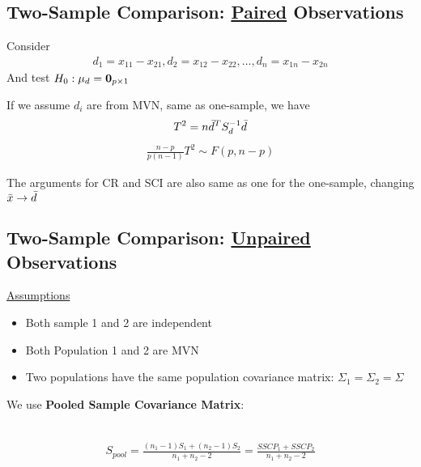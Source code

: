 \documentclass[12pt]{extarticle}
\newcommand{\<}{\langle}
\renewcommand{\>}{\rangle}
\theoremstyle{definition}
\begin{document}
\newpage
\subsection{Two-Sample Comparison: \underline{Paired} Observations}
Consider 
\begin{eqnarray*}
d_1 = x_{11}-x_{21}, d_2 = x_{12}-x_{22}, ..., d_n = x_{1n}-x_{2n} 
\end{eqnarray*}
And test $H_0: \mu_d = {\bf 0}_{p \times 1}$ \\

\begin{tcolorbox}[enhanced, drop fuzzy shadow, title=Statistics for paired observations]
If we assume $d_i$ are from MVN, same as one-sample, we have
\begin{eqnarray*}
T^2 = n\Bar{d}^T S_d^{-1} \Bar{d} \end{eqnarray*}
\begin{eqnarray*}
\frac{n-p}{p(n-1)}T^2 \sim F(p, n-p)
\end{eqnarray*}
\end{tcolorbox}

The arguments for CR and SCI are also same as one for the one-sample, changing $\Bar{x} \rightarrow \Bar{d}$ \\

\newpage
\subsection{Two-Sample Comparison: \underline{Unpaired} Observations}
\underline{Assumptions}
\begin{itemize}
    \item Both sample 1 and 2 are independent\\
    \item Both Population 1 and 2 are MVN\\
    \item Two populations have the same population covariance matrix: $\Sigma_1 = \Sigma_2 = \Sigma$
\end{itemize}

We use \textbf{Pooled Sample Covariance Matrix}:\\
\ \\
\begin{tcolorbox}[enhanced, drop fuzzy shadow, title=Pooled Sample Covariance Matrix]
\begin{eqnarray*}
S_{pool} = \frac{(n_1 -1)S_1 + (n_2 -1)S_2}{n_1 + n_2 -2} = \frac{SSCP_1 + SSCP_2}{n_1 + n_2 -2}
\end{eqnarray*}
\end{tcolorbox}
\end{document}
